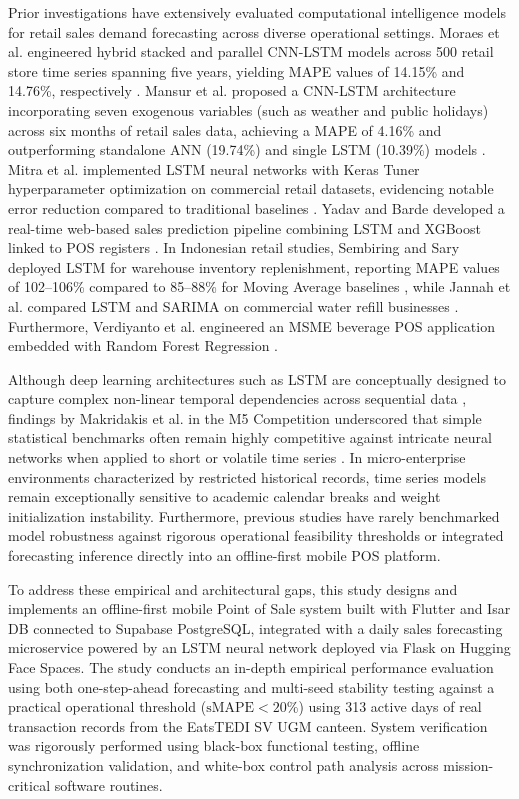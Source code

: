 \documentclass[10pt,a4paper]{article}
\begin{document}
Prior investigations have extensively evaluated computational intelligence models for retail sales demand forecasting across diverse operational settings. Moraes et al. engineered hybrid stacked and parallel CNN-LSTM models across 500 retail store time series spanning five years, yielding MAPE values of 14.15\% and 14.76\%, respectively \cite{moraes2024}. Mansur et al. proposed a CNN-LSTM architecture incorporating seven exogenous variables (such as weather and public holidays) across six months of retail sales data, achieving a MAPE of 4.16\% and outperforming standalone ANN (19.74\%) and single LSTM (10.39\%) models \cite{mansur2025}. Mitra et al. implemented LSTM neural networks with Keras Tuner hyperparameter optimization on commercial retail datasets, evidencing notable error reduction compared to traditional baselines \cite{mitra2024}. Yadav and Barde developed a real-time web-based sales prediction pipeline combining LSTM and XGBoost linked to POS registers \cite{yadav2025}. In Indonesian retail studies, Sembiring and Sary deployed LSTM for warehouse inventory replenishment, reporting MAPE values of 102--106\% compared to 85--88\% for Moving Average baselines \cite{sembiring2025}, while Jannah et al. compared LSTM and SARIMA on commercial water refill businesses \cite{jannah2025}. Furthermore, Verdiyanto et al. engineered an MSME beverage POS application embedded with Random Forest Regression \cite{verdiyanto2025}.

Although deep learning architectures such as LSTM are conceptually designed to capture complex non-linear temporal dependencies across sequential data \cite{hochreiter1997, goodfellow2016deep}, findings by Makridakis et al. in the M5 Competition underscored that simple statistical benchmarks often remain highly competitive against intricate neural networks when applied to short or volatile time series \cite{makridakis2022}. In micro-enterprise environments characterized by restricted historical records, time series models remain exceptionally sensitive to academic calendar breaks and weight initialization instability. Furthermore, previous studies have rarely benchmarked model robustness against rigorous operational feasibility thresholds or integrated forecasting inference directly into an offline-first mobile POS platform.

To address these empirical and architectural gaps, this study designs and implements an offline-first mobile Point of Sale system built with Flutter and Isar DB connected to Supabase PostgreSQL, integrated with a daily sales forecasting microservice powered by an LSTM neural network deployed via Flask on Hugging Face Spaces. The study conducts an in-depth empirical performance evaluation using both one-step-ahead forecasting and multi-seed stability testing against a practical operational threshold ($\text{sMAPE} < 20\%$) using 313 active days of real transaction records from the EatsTEDI SV UGM canteen. System verification was rigorously performed using black-box functional testing, offline synchronization validation, and white-box control path analysis across mission-critical software routines.
\end{document}
